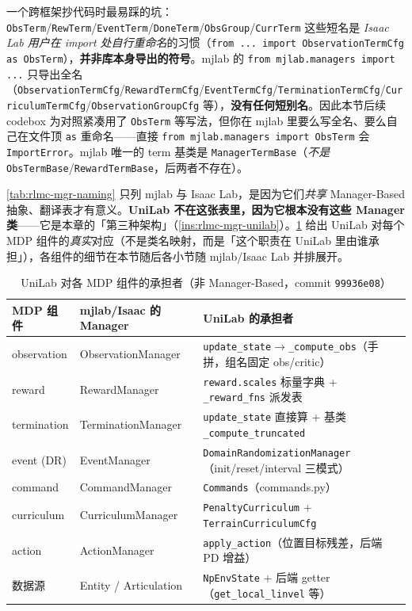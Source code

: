 \begin{insight}\label{ins:rlmc-mgr-alias}
一个跨框架抄代码时最易踩的坑：\verb|ObsTerm|/\verb|RewTerm|/\verb|EventTerm|/\verb|DoneTerm|/\verb|ObsGroup|/\verb|CurrTerm| 这些短名是 \emph{Isaac Lab 用户在 import 处自行重命名}的习惯（\verb|from ... import ObservationTermCfg as ObsTerm|），\textbf{并非库本身导出的符号}。mjlab 的 \verb|from mjlab.managers import ...| 只导出全名（\verb|ObservationTermCfg|/\verb|RewardTermCfg|/\verb|EventTermCfg|/\verb|TerminationTermCfg|/\verb|CurriculumTermCfg|/\verb|ObservationGroupCfg| 等），\textbf{没有任何短别名}。因此本节后续 codebox 为对照紧凑用了 \verb|ObsTerm| 等写法，但你在 mjlab 里要么写全名、要么自己在文件顶 \verb|as| 重命名——直接 \verb|from mjlab.managers import ObsTerm| 会 \verb|ImportError|。mjlab 唯一的 term 基类是 \verb|ManagerTermBase|（\emph{不是} \verb|ObsTermBase|/\verb|RewardTermBase|，后两者不存在）。
\end{insight}

\cref{tab:rlmc-mgr-naming} 只列 mjlab 与 Isaac Lab，是因为它们\emph{共享} Manager-Based 抽象、翻译表才有意义。\textbf{UniLab 不在这张表里，因为它根本没有这些 Manager 类}——它是本章的「第三种架构」（\cref{ins:rlmc-mgr-unilab}）。\cref{tab:rlmc-mgr-unilabmap} 给出 UniLab 对每个 MDP 组件的\emph{真实}对应（不是类名映射，而是「这个职责在 UniLab 里由谁承担」），各组件的细节在本节随后各小节随 mjlab/Isaac Lab 并排展开。

\begin{table}[ht]
\centering
\caption{UniLab 对各 MDP 组件的承担者（非 Manager-Based，commit \texttt{99936e08}）}
\label{tab:rlmc-mgr-unilabmap}
\small
\begin{tabular}{@{}lll@{}}
\toprule
MDP 组件 & mjlab/Isaac 的 Manager & UniLab 的承担者 \\
\midrule
observation & ObservationManager & \verb|update_state|$\to$\verb|_compute_obs|（手拼，组名固定 obs/critic） \\
reward & RewardManager & \verb|reward.scales| 标量字典 + \verb|_reward_fns| 派发表 \\
termination & TerminationManager & \verb|update_state| 直接算 + 基类 \verb|_compute_truncated| \\
event (DR) & EventManager & \verb|DomainRandomizationManager|（init/reset/interval 三模式） \\
command & CommandManager & \verb|Commands|（commands.py） \\
curriculum & CurriculumManager & \verb|PenaltyCurriculum| + \verb|TerrainCurriculumCfg| \\
action & ActionManager & \verb|apply_action|（位置目标残差，后端 PD 增益） \\
数据源 & Entity / Articulation & \verb|NpEnvState| + 后端 getter（\verb|get_local_linvel| 等） \\
\bottomrule
\end{tabular}
\end{table}

